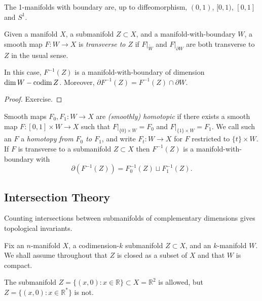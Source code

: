 \documentclass[a4paper,11pt]{article}
\begin{document}
	\begin{ex}
		The 1-manifolds with boundary are, up to diffeomorphism, $(0,1)$, $[0,1)$, $[0,1]$ and $S^1$.
	\end{ex}

	\begin{defi}
		Given a manifold $X$, a submanifold $Z \subset X$, and a manifold-with-boundary $W$, a smooth map $F: W \to X$ is \emph{transverse to $Z$} if $F\big|_{\mathring{W}}$ and $F\big|_{\partial W}$ are both transverse to $Z$ in the usual sense.
	\end{defi}

	\begin{prop}
		In this case, $F^{-1}(Z)$ is a manifold-with-boundary of dimension $\dim W - \operatorname{codim} Z$. Moreover, $\partial F^{-1}(Z) = F^{-1}(Z)\cap \partial W$. 
	\end{prop}

	\begin{proof}
		Exercise.
	\end{proof}

	\begin{ex}
		Smooth maps $F_0,F_1: W \to X$ are \emph{(smoothly) homotopic} if there exists a smooth map $F: [0,1]\times W \to X$ such that $F \big|_{\{0\}\times W} = F_0$ and $F\big|_{\{1\}\times W} = F_1$. We call such an $F$ a \emph{homotopy from $F_0$ to $F_1$}, and write $F_t : W \to X$ for $F$ restricted to $\{t\}\times W$. If $F$ is transverse to a submanifold $Z \subset X$ then $F^{-1}(Z)$ is a manifold-with-boundary with
		\[
			\partial(F^{-1}(Z)) = F_0^{-1}(Z) \sqcup F_1^{-1}(Z).
		\]
	\end{ex}

	\subsection{Intersection Theory} 

	Counting intersections between submanifolds of complementary dimensions gives topological invariants.

	Fix an $n$-manifold $X$, a codimension-$k$ submanifold $Z \subset X$, and an $k$-manifold $W$. We shall assume throughout that $Z$ is closed as a subset of $X$ and that $W$ is compact.

	\begin{ex}
		The submanifold $Z = \{(x,0):x \in \mathbb{R}\} \subset X = \mathbb{R}^2$ is allowed, but $Z = \{(x,0): x \in \mathbb{R}^*\}$ is not.
	\end{ex}
\end{document}
